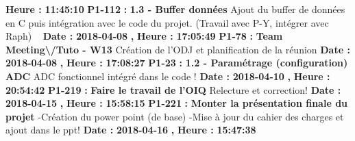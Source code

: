 \documentclass{article}%
\begin{document}
\textbf{ Heure : }%
\textbf{11:45:10}%
\newline%
%
\textbf{P1{-}112 }%
\textbf{ : }%
\textbf{ 1.3 {-} Buffer données}%
\newline%
\newline%
%
Ajout du buffer de données en C puis intégration avec le code du projet. (Travail avec P{-}Y, intégrer avec Raph)\newline%
~\newline%
\newline%
%
\textbf{Date : }%
\textbf{2018{-}04{-}08}%
\textbf{,}%
\textbf{ Heure : }%
\textbf{17:05:49}%
\newline%
%
\textbf{P1{-}78 }%
\textbf{ : }%
\textbf{ Team Meeting\textbackslash{}/Tuto {-} W13}%
\newline%
\newline%
%
Création de l'ODJ et planification de la réunion\newline%
\newline%
%
\textbf{Date : }%
\textbf{2018{-}04{-}08}%
\textbf{,}%
\textbf{ Heure : }%
\textbf{17:08:27}%
\newline%
%
\textbf{P1{-}23 }%
\textbf{ : }%
\textbf{ 1.2 {-} Paramétrage (configuration) ADC}%
\newline%
\newline%
%
ADC fonctionnel intégré dans le code !\newline%
\newline%
%
\textbf{Date : }%
\textbf{2018{-}04{-}10}%
\textbf{,}%
\textbf{ Heure : }%
\textbf{20:54:42}%
\newline%
%
\textbf{P1{-}219 }%
\textbf{ : }%
\textbf{ Faire le travail de l'OIQ}%
\newline%
\newline%
%
Relecture et correction!\newline%
\newline%
%
\textbf{Date : }%
\textbf{2018{-}04{-}15}%
\textbf{,}%
\textbf{ Heure : }%
\textbf{15:58:15}%
\newline%
%
\textbf{P1{-}221 }%
\textbf{ : }%
\textbf{ Monter la présentation finale du projet }%
\newline%
\newline%
%
{-}Création du power point (de base)\newline%
{-}Mise à jour du cahier des charges et ajout dans le ppt!\newline%
\newline%
%
\textbf{Date : }%
\textbf{2018{-}04{-}16}%
\textbf{,}%
\textbf{ Heure : }%
\textbf{15:47:38}%
\end{document}

